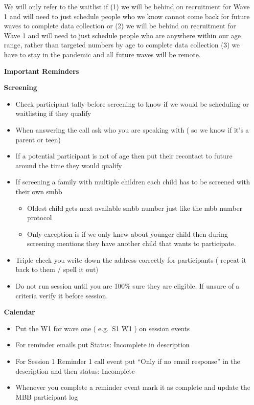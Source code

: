 \documentclass[
]{book}
\providecommand{\tightlist}{%
  \setlength{\itemsep}{0pt}\setlength{\parskip}{0pt}}
\begin{document}
We will only refer to the waitlist if (1) we will be behind on recruitment for Wave 1 and will need to just schedule people who we know cannot come back for future waves to complete data collection or (2) we will be behind on recruitment for Wave 1 and will need to just schedule people who are anywhere within our age range, rather than targeted numbers by age to complete data collection (3) we have to stay in the pandemic and all future waves will be remote.

\textbf{Important Reminders}

\textbf{Screening}

\begin{itemize}
\tightlist
\item
  Check participant tally before screening to know if we would be scheduling or waitlisting if they qualify
\item
  When answering the call ask who you are speaking with ( so we know if it's a parent or teen)
\item
  If a potential participant is not of age then put their recontact to future around the time they would qualify
\item
  If screening a family with multiple children each child has to be screened with their own smbb

  \begin{itemize}
  \tightlist
  \item
    Oldest child gets next available smbb number just like the mbb number protocol
  \item
    Only exception is if we only knew about younger child then during screening mentions they have another child that wants to participate.
  \end{itemize}
\item
  Triple check you write down the address correctly for participants ( repeat it back to them / spell it out)
\item
  Do not run session until you are 100\% sure they are eligible. If unsure of a criteria verify it before session.
\end{itemize}

\textbf{Calendar}

\begin{itemize}
\tightlist
\item
  Put the W1 for wave one ( e.g.~S1 W1 ) on session events
\item
  For reminder emails put Status: Incomplete in description
\item
  For Session 1 Reminder 1 call event put ``Only if no email response'' in the description and then status: Incomplete
\item
  Whenever you complete a reminder event mark it as complete and update the MBB participant log
\end{itemize}
\end{document}
